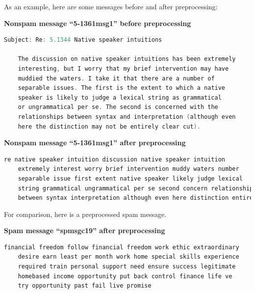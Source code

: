 \documentclass[10pt,a4paper]{article}
\begin{document}
  As an example, here are some messages before and after preprocessing:

  \vspace{2ex}
  \textbf{Nonspam message ``5-1361msg1'' before preprocessing}
  \begin{lstlisting}[language=C, basicstyle=\footnotesize, showspaces=false]
    Subject: Re: 5.1344 Native speaker intuitions
  
    The discussion on native speaker intuitions has been extremely
    interesting, but I worry that my brief intervention may have
    muddied the waters. I take it that there are a number of
    separable issues. The first is the extent to which a native
    speaker is likely to judge a lexical string as grammatical
    or ungrammatical per se. The second is concerned with the
    relationships between syntax and interpretation (although even
    here the distinction may not be entirely clear cut).
  \end{lstlisting}



  \vspace{2ex}
  \textbf{Nonspam message ``5-1361msg1'' after preprocessing}
  \begin{lstlisting}[language=C, basicstyle=\footnotesize, showspaces=false]
    re native speaker intuition discussion native speaker intuition 
    extremely interest worry brief intervention muddy waters number 
    separable issue first extent native speaker likely judge lexical 
    string grammatical ungrammatical per se second concern relationship 
    between syntax interpretation although even here distinction entirely clear cut
  \end{lstlisting}


  \vspace{2ex}
  For comparison, here is a preprocessed spam message.


  \vspace{2ex}
  \textbf{Spam message ``spmsgc19'' after preprocessing}
  \begin{lstlisting}[language=C, basicstyle=\footnotesize, showspaces=false]
    financial freedom follow financial freedom work ethic extraordinary 
    desire earn least per month work home special skills experience 
    required train personal support need ensure success legitimate 
    homebased income opportunity put back control finance life ve 
    try opportunity past fail live promise
  \end{lstlisting}
\end{document}

